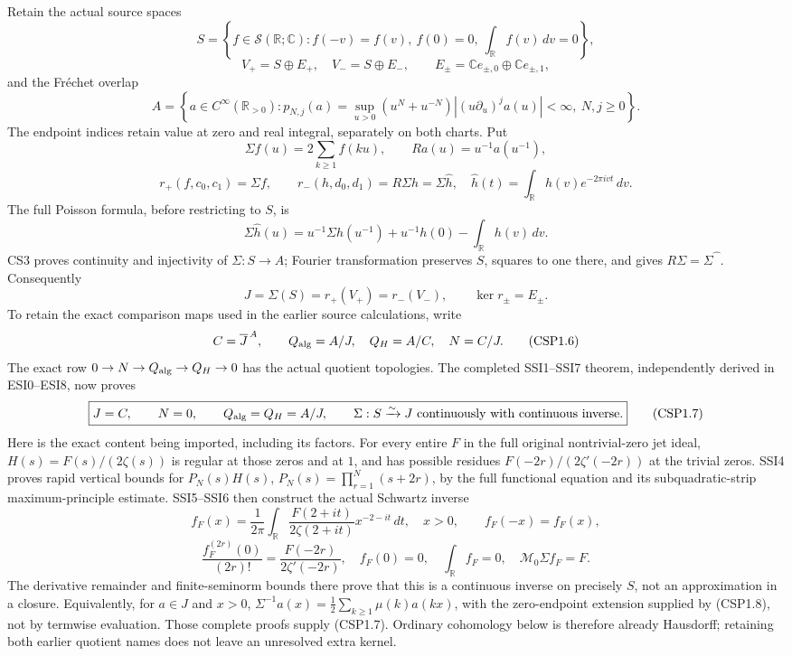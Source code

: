 Retain the actual source spaces \[
S=\left\{f\in\mathcal S(\mathbb R;\mathbb C):
f(-v)=f(v),\ f(0)=0,\ \int_{\mathbb R}f(v)\,dv=0\right\},
\] \[
V_+=S\oplus E_+,\quad V_-=S\oplus E_-,
\qquad E_\pm=\mathbb C e_{\pm,0}\oplus\mathbb C e_{\pm,1},
\tag{CSP1.1}
\] and the Fréchet overlap \[
A=\left\{a\in C^\infty(\mathbb R_{>0}):
p_{N,j}(a)=\sup_{u>0}(u^N+u^{-N})
|(u\partial_u)^j a(u)|<\infty,\ N,j\ge0\right\}.
\tag{CSP1.2}
\] The endpoint indices retain value at zero and real integral,
separately on both charts. Put \[
\Sigma f(u)=2\sum_{k\ge1}f(ku),\qquad
Ra(u)=u^{-1}a(u^{-1}),
\] \[
r_+(f,c_0,c_1)=\Sigma f,\qquad
r_-(h,d_0,d_1)=R\Sigma h=\Sigma\widehat h,
\quad
\widehat h(t)=\int_{\mathbb R}h(v)e^{-2\pi ivt}\,dv.
\tag{CSP1.3}
\] The full Poisson formula, before restricting to \(S\), is \[
\Sigma\widehat h(u)
=u^{-1}\Sigma h(u^{-1})+u^{-1}h(0)-\int_{\mathbb R}h(v)\,dv.
\tag{CSP1.4}
\] CS3 proves continuity and injectivity of \(\Sigma:S\to A\); Fourier
transformation preserves \(S\), squares to one there, and gives
\(R\Sigma=\Sigma\widehat{\phantom h}\). Consequently \[
J=\Sigma(S)=r_+(V_+)=r_-(V_-),\qquad
\ker r_\pm=E_\pm.
\tag{CSP1.5}
\] To retain the exact comparison maps used in the earlier source
calculations, write \[
C=\overline J^{\,A},\qquad
Q_{\rm alg}=A/J,\quad Q_H=A/C,\quad N=C/J.
\tag{CSP1.6}
\] The exact row \(0\to N\to Q_{\rm alg}\to Q_H\to0\) has the actual
quotient topologies. The completed SSI1--SSI7 theorem, independently
derived in ESI0--ESI8, now proves \[
\boxed{J=C,\qquad N=0,\qquad Q_{\rm alg}=Q_H=A/J,\qquad
\Sigma:S\xrightarrow{\sim}J\text{ continuously with continuous inverse}.}
\tag{CSP1.7}
\] Here is the exact content being imported, including its factors. For
every entire \(F\) in the full original nontrivial-zero jet ideal,
\(H(s)=F(s)/(2\zeta(s))\) is regular at those zeros and at \(1\), and
has possible residues \(F(-2r)/(2\zeta'(-2r))\) at the trivial zeros.
SSI4 proves rapid vertical bounds for \(P_N(s)H(s)\),
\(P_N(s)=\prod_{r=1}^N(s+2r)\), by the full functional equation and its
subquadratic-strip maximum-principle estimate. SSI5--SSI6 then construct
the actual Schwartz inverse \[
f_F(x)=\frac1{2\pi}\int_{\mathbb R}
\frac{F(2+it)}{2\zeta(2+it)}x^{-2-it}\,dt,\quad x>0,
\qquad f_F(-x)=f_F(x),
\] \[
\frac{f_F^{(2r)}(0)}{(2r)!}
=\frac{F(-2r)}{2\zeta'(-2r)},\quad
f_F(0)=0,\quad \int_{\mathbb R}f_F=0,\quad
\mathcal M_0\Sigma f_F=F.
\tag{CSP1.8}
\] The derivative remainder and finite-seminorm bounds there prove that
this is a continuous inverse on precisely \(S\), not an approximation in
a closure. Equivalently, for \(a\in J\) and \(x>0\),
\(\Sigma^{-1}a(x)=\tfrac12\sum_{k\ge1}\mu(k)a(kx)\), with the
zero-endpoint extension supplied by (CSP1.8), not by termwise
evaluation. Those complete proofs supply (CSP1.7). Ordinary cohomology
below is therefore already Hausdorff; retaining both earlier quotient
names does not leave an unresolved extra kernel.


